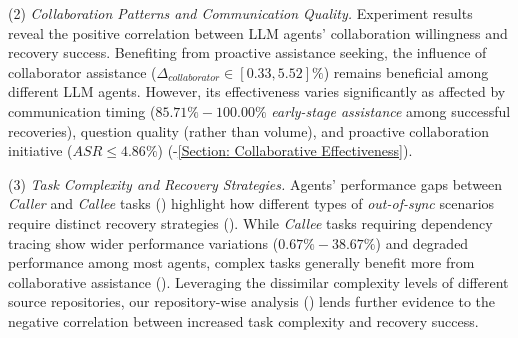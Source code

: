 
(2) \textit{Collaboration Patterns and Communication Quality.}
Experiment results reveal the positive correlation between LLM agents' collaboration willingness and recovery success. Benefiting from proactive assistance seeking, the influence of collaborator assistance ($\Delta_\textit{collaborator} \in [0.33, 5.52] \%$) remains beneficial among different LLM agents.
However, its effectiveness varies significantly as affected by communication timing ($85.71\%-100.00\%$ \textit{early-stage assistance} among successful recoveries), question quality (rather than volume), and proactive collaboration initiative ($ASR \leq 4.86\%$) (-\ref{Section: Collaborative Effectiveness}). 

(3) \textit{Task Complexity and Recovery Strategies.}
Agents' performance gaps between \textit{Caller} and \textit{Callee} tasks () highlight how different types of \textit{out-of-sync} scenarios require distinct recovery strategies ().
While \textit{Callee} tasks requiring dependency tracing show wider performance variations ($0.67\%-38.67\%$) and degraded performance among most agents, complex tasks generally benefit more from collaborative assistance ().
Leveraging the dissimilar complexity levels of different source repositories, our repository-wise analysis () lends further evidence to the negative correlation between increased task complexity and recovery success. 

